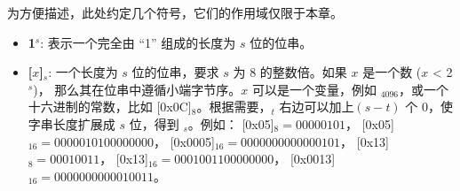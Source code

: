 \documentclass[main\_\_CN.tex]{subfiles}
\begin{document}
为方便描述，此处约定几个符号，它们的作用域仅限于本章。

\begin{itemize}

    \item {\bfseries 1\begin{math}^s\end{math}}:
        表示一个完全由 “1” 组成的长度为 \begin{math}s\end{math} 位的位串。

    \item {\bfseries [\begin{math}x\end{math}]\begin{math}_{s}\end{math}}:
       一个长度为 \begin{math}s\end{math} 位的位串，要求 \begin{math}s\end{math} 为 8 的整数倍。如果 \begin{math}x\end{math} 是一个数 (\begin{math}x\end{math} < 2\begin{math}^s\end{math})， 那么其在位串中遵循小端字节序。\begin{math}x\end{math} 可以是一个变量，例如 \begin{math}[Y]_{4096}\end{math}，或一个十六进制的常数，比如 [0x0C]\begin{math}_{8}\end{math}。根据需要，\begin{math}[x]_{t}\end{math} 右边可以加上\begin{math} (s-t) \end{math} 个 0，使字串长度扩展成 \begin{math}s\end{math} 位，得到 \begin{math}[x]_{s}\end{math}。例如：
       [0x05]\begin{math}_{8} = 00000101\end{math}，
       [0x05]\begin{math}_{16} = 00000101 00000000\end{math}，
       [0x0005]\begin{math}_{16} = 00000000 00000101\end{math}，
       [0x13]\begin{math}_{8} = 00010011\end{math}，
       [0x13]\begin{math}_{16} = 00010011 00000000\end{math}，
       [0x0013]\begin{math}_{16} = 00000000 00010011\end{math}。


\end{itemize}
\end{document}
